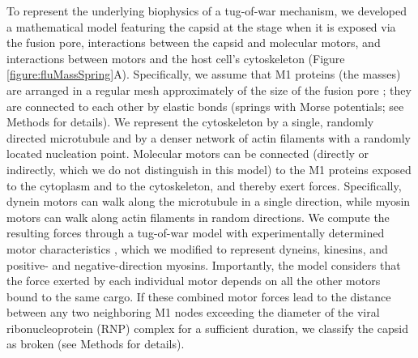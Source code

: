 To represent the underlying biophysics of a tug-of-war mechanism, we developed a mathematical model featuring the capsid at the stage when it is exposed via the fusion pore, interactions between the capsid and molecular motors, and interactions between motors and the host cell’s cytoskeleton (Figure \ref{figure:fluMassSpring}A). Specifically, we assume that M1 proteins (the masses) are arranged in a regular mesh approximately of the size of the fusion pore \cite{hilsch2014influenza}; they are connected to each other by elastic bonds (springs with Morse potentials; see Methods for details). We represent the cytoskeleton by a single, randomly directed microtubule and by a denser network of actin filaments with a randomly located nucleation point. Molecular motors can be connected (directly or indirectly, which we do not distinguish in this model) to the M1 proteins exposed to the cytoplasm and to the cytoskeleton, and thereby exert forces. Specifically, dynein motors can walk along the microtubule in a single direction, while myosin motors can walk along actin filaments in random directions. We compute the resulting forces through a tug-of-war model with experimentally determined motor characteristics \cite{gennerich2007force, muller2008tug, norstrom2010unconventional}, which we modified to represent dyneins, kinesins, and positive- and negative-direction myosins. Importantly, the model considers that the force exerted by each individual motor depends on all the other motors bound to the same cargo. If these combined motor forces lead to the distance between any two neighboring M1 nodes exceeding the diameter of the viral ribonucleoprotein (RNP) complex for a sufficient duration, we classify the capsid as broken (see Methods for details).

